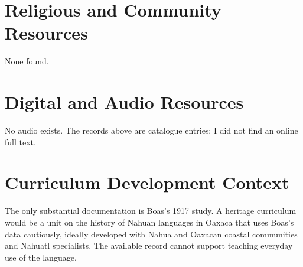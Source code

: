 \documentclass[12pt]{article}
\begin{document}
\section{Religious and Community Resources}
None found.

\section{Digital and Audio Resources}
No audio exists. The records above are catalogue entries; I did not find an online full text.

\section{Curriculum Development Context}
The only substantial documentation is Boas's 1917 study. A heritage curriculum would be a unit on the history of Nahuan languages in Oaxaca that uses Boas's data cautiously, ideally developed with Nahua and Oaxacan coastal communities and Nahuatl specialists. The available record cannot support teaching everyday use of the language.
\end{document}
